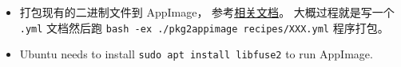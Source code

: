 
\begin{issues}
\issueDraft
\end{issues}

\begin{itemize}
\item 打包现有的二进制文件到 AppImage， 参考\href{https://docs.appimage.org/packaging-guide/converting-binary-packages/index.html#ref-convert-existing-binary-packages}{相关文档}。 大概过程就是写一个 \verb`.yml` 文档然后跑 \verb`bash -ex ./pkg2appimage recipes/XXX.yml` 程序打包。
\item Ubuntu needs to install \verb`sudo apt install libfuse2` to run AppImage.
\end{itemize}
